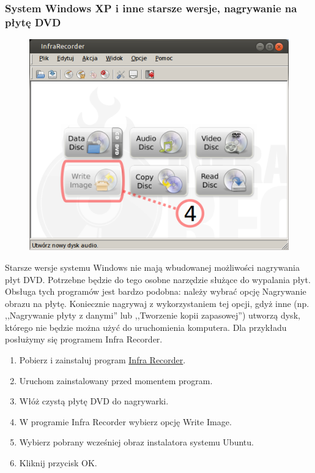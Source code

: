 \vspace{1cm}

\subsubsection{System Windows XP i inne starsze wersje, nagrywanie na płytę DVD}
\begin{figure}
	\vspace{-10pt}
	\includegraphics[width=\linewidth]{images/instalacja_nagrywanie_obrazu_DVD_winXP.png}
\end{figure}

Starsze wersje systemu Windows nie mają wbudowanej możliwości nagrywania płyt DVD. Potrzebne będzie do tego osobne narzędzie służące do wypalania płyt. Obsługa tych programów jest bardzo podobna: należy wybrać opcję \textcolor{ubuntu_orange}{Nagrywanie obrazu na płytę}. Koniecznie nagrywaj z wykorzystaniem tej opcji, gdyż inne (np. ,,Nagrywanie płyty z danymi'' lub ,,Tworzenie kopii zapasowej'') utworzą dysk, którego nie będzie można użyć do uruchomienia komputera. Dla przykładu posłużymy się programem Infra Recorder.

\begin{enumerate}[label=\protect\circled{\arabic*}]
\item Pobierz i zainstaluj program \href{http://infrarecorder.org/?page_id=5}{Infra Recorder}.
\item Uruchom zainstalowany przed momentem program.
\item Włóż czystą płytę DVD do nagrywarki.
\item W programie Infra Recorder wybierz opcję \textcolor{ubuntu_orange}{Write Image}.
\item Wybierz pobrany wcześniej obraz instalatora systemu Ubuntu.
\item Kliknij przycisk \textcolor{ubuntu_orange}{OK}.
\end{enumerate}

